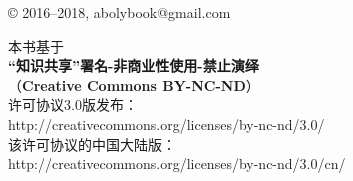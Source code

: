 \thispagestyle{empty}

\begin{center}
© 2016--2018, abolybook@gmail.com
\medskip

本书基于\\
\textbf{“知识共享”署名-非商业性使用-禁止演绎}\\
（\textbf{Creative Commons BY-NC-ND}）\\
许可协议3.0版发布：\\
http://creativecommons.org/licenses/by-nc-nd/3.0/\\
该许可协议的中国大陆版：\\
http://creativecommons.org/licenses/by-nc-nd/3.0/cn/
\end{center}
